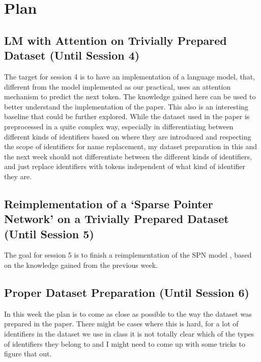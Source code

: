 \documentclass[11pt]{article}
\begin{document}
\section{Plan}
\subsection{LM with Attention on Trivially Prepared Dataset (Until Session 4)}
The target for session 4 is to have an implementation of a language model, that, different from the model implemented as our practical, uses an attention mechanism to predict the next token. The knowledge gained here can be used to better understand the implementation of the paper. This also is an interesting baseline that could be further explored.
While the dataset used in the paper is preprocessed in a quite complex way, especially in differentiating between different kinds of identifiers based on where they are introduced and respecting the scope of identifiers for name replacement, my dataset preparation in this and the next week should not differentiate between the different kinds of identifiers, and just replace identifiers with tokens independent of what kind of identifier they are.

\subsection{Reimplementation of a `Sparse Pointer Network’ on a Trivially Prepared Dataset
 (Until Session 5)}
 The goal for session 5 is to finish a reimplementation of the SPN model \citep{bhoopchand2016learning}, based on the knowledge gained from the previous week. 
 
 \subsection{Proper Dataset Preparation (Until Session 6)}
In this week the plan is to come as close as possible to the way the dataset was prepared in the paper. There might be cases where this is hard, for a lot of identifiers in the dataset we use in class it is not totally clear which of the types of identifiers they belong to and I  might need to come up with some tricks to figure that out.\\
\end{document}
